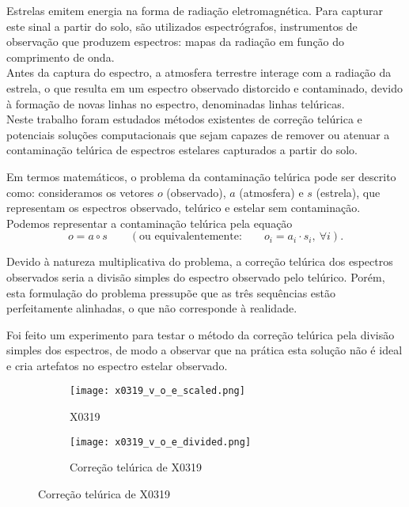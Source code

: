 \documentclass[a1]{sciposter}
\begin{document}
\begin{multicols}{2}


Estrelas emitem energia na forma de radiação eletromagnética. Para capturar este sinal a partir do solo, são utilizados espectrógrafos, instrumentos de observação que produzem espectros: mapas da radiação em função do comprimento de onda.\\

Antes da captura do espectro, a atmosfera terrestre interage com a radiação da estrela, o que resulta em um espectro observado distorcido e contaminado, devido à formação de novas linhas no espectro, denominadas linhas telúricas.\\

Neste trabalho foram estudados métodos existentes de correção telúrica e potenciais soluções computacionais que sejam capazes de remover ou atenuar a contaminação telúrica de espectros estelares capturados a partir do solo.


Em termos matemáticos, o problema da contaminação telúrica pode ser descrito como: consideramos os vetores $o$ (observado), $a$ (atmosfera) e $s$ (estrela), que representam os espectros observado, telúrico e estelar sem contaminação. Podemos representar a contaminação telúrica pela equação
\begin{equation*}
    o = a \circ s \qquad \left(\mbox{ou equivalentemente:} \qquad o_i = a_i\cdot s_i,\ \forall i\right).
\end{equation*}

Devido à natureza multiplicativa do problema, a correção telúrica dos espectros observados seria a divisão simples do espectro observado pelo telúrico. Porém, esta formulação do problema pressupõe que as três sequências estão perfeitamente alinhadas, o que não corresponde à realidade.


Foi feito um experimento para testar o método da correção telúrica pela divisão simples dos espectros, de modo a observar que na prática esta solução não é ideal e cria artefatos no espectro estelar observado.

\begin{figure}
 \centering
 \begin{subfigure}{0.4\textwidth}
  \centering
  \texttt{[image: x0319\_v\_o\_e\_scaled.png]}
  \caption{X0319}
 \end{subfigure}\hfil
 \begin{subfigure}{0.4\textwidth}
  \centering
  \texttt{[image: x0319\_v\_o\_e\_divided.png]}
  \caption{Correção telúrica de X0319}
 \end{subfigure}\hfil
\end{figure}


\end{multicols}
\end{document}
